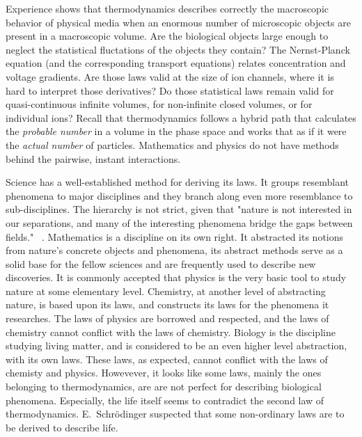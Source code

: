 Experience shows that thermodynamics describes correctly the
macroscopic behavior of physical media when an enormous 
number of microscopic objects are present in a macroscopic
volume. Are the biological objects large enough to
neglect the statistical fluctations of the objects
they contain? The Nernst-Planck equation (and the corresponding transport equations) relates concentration and voltage gradients.
Are those laws valid at the size of ion channels, where
it is hard to interpret those derivatives?
Do those statistical laws remain valid for quasi-continuous 
infinite volumes, for non-infinite closed volumes,
or for individual ions? Recall that thermodynamics 
follows a hybrid path that calculates the \textit{probable number}
in a volume in the phase space and works that as if it were
the \textit{actual number} of particles. 
Mathematics and physics do not have methods behind the
pairwise, instant interactions.


Science has a well-established method for deriving its laws. It groups resemblant phenomena to major disciplines and they branch along even more resemblance to sub-disciplines.
The hierarchy is not strict, given that "{nature is not interested in our separations, and many of the interesting phenomena bridge the gaps between fields.}" ~\cite{FeynmanThinking:1980}.
Mathematics is a discipline on its own right. It abstracted its notions from nature's concrete objects and phenomena, its abstract methods serve as a solid base for the fellow sciences and are frequently used to describe new discoveries.
It is commonly accepted that physics is  the very basic tool to study nature at some elementary level.
Chemistry, at another level of abstracting nature, is based upon its laws, and constructs its laws for the phenomena it researches.
The laws of physics are borrowed and respected, and the laws of chemistry cannot conflict with the laws of chemistry.
Biology is the discipline studying living matter, and is considered to be an even higher level abstraction, with its own laws. These laws, as expected, cannot conflict with the laws of chemisty and physics.
Howevever, it looks like some laws, mainly the ones belonging to thermodynamics, are are not perfect for describing biological phenomena. Especially, the life itself seems to contradict 
the second law of thermodynamics. E.~Schrödinger suspected that 
some non-ordinary laws are to be derived to describe life.

